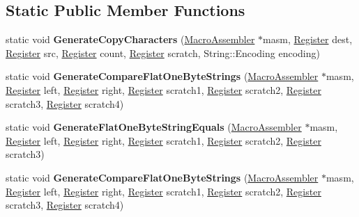 \subsection*{Static Public Member Functions}
\begin{DoxyCompactItemize}
\item 
static void {\bfseries Generate\+Copy\+Characters} (\hyperlink{classv8_1_1internal_1_1_macro_assembler}{Macro\+Assembler} $\ast$masm, \hyperlink{structv8_1_1internal_1_1_register}{Register} dest, \hyperlink{structv8_1_1internal_1_1_register}{Register} src, \hyperlink{structv8_1_1internal_1_1_register}{Register} count, \hyperlink{structv8_1_1internal_1_1_register}{Register} scratch, String\+::\+Encoding encoding)\hypertarget{classv8_1_1internal_1_1_string_helper_acd699f7bf40a599d86efca2556efde61}{}\label{classv8_1_1internal_1_1_string_helper_acd699f7bf40a599d86efca2556efde61}

\item 
static void {\bfseries Generate\+Compare\+Flat\+One\+Byte\+Strings} (\hyperlink{classv8_1_1internal_1_1_macro_assembler}{Macro\+Assembler} $\ast$masm, \hyperlink{structv8_1_1internal_1_1_register}{Register} left, \hyperlink{structv8_1_1internal_1_1_register}{Register} right, \hyperlink{structv8_1_1internal_1_1_register}{Register} scratch1, \hyperlink{structv8_1_1internal_1_1_register}{Register} scratch2, \hyperlink{structv8_1_1internal_1_1_register}{Register} scratch3, \hyperlink{structv8_1_1internal_1_1_register}{Register} scratch4)\hypertarget{classv8_1_1internal_1_1_string_helper_ac523db36072fd75b5d42b403ac6ef1ff}{}\label{classv8_1_1internal_1_1_string_helper_ac523db36072fd75b5d42b403ac6ef1ff}

\item 
static void {\bfseries Generate\+Flat\+One\+Byte\+String\+Equals} (\hyperlink{classv8_1_1internal_1_1_macro_assembler}{Macro\+Assembler} $\ast$masm, \hyperlink{structv8_1_1internal_1_1_register}{Register} left, \hyperlink{structv8_1_1internal_1_1_register}{Register} right, \hyperlink{structv8_1_1internal_1_1_register}{Register} scratch1, \hyperlink{structv8_1_1internal_1_1_register}{Register} scratch2, \hyperlink{structv8_1_1internal_1_1_register}{Register} scratch3)\hypertarget{classv8_1_1internal_1_1_string_helper_af4eb5dbd003a23d35fa965edcd1c4856}{}\label{classv8_1_1internal_1_1_string_helper_af4eb5dbd003a23d35fa965edcd1c4856}

\item 
static void {\bfseries Generate\+Compare\+Flat\+One\+Byte\+Strings} (\hyperlink{classv8_1_1internal_1_1_macro_assembler}{Macro\+Assembler} $\ast$masm, \hyperlink{structv8_1_1internal_1_1_register}{Register} left, \hyperlink{structv8_1_1internal_1_1_register}{Register} right, \hyperlink{structv8_1_1internal_1_1_register}{Register} scratch1, \hyperlink{structv8_1_1internal_1_1_register}{Register} scratch2, \hyperlink{structv8_1_1internal_1_1_register}{Register} scratch3, \hyperlink{structv8_1_1internal_1_1_register}{Register} scratch4)\hypertarget{classv8_1_1internal_1_1_string_helper_ac523db36072fd75b5d42b403ac6ef1ff}{}\label{classv8_1_1internal_1_1_string_helper_ac523db36072fd75b5d42b403ac6ef1ff}


\end{DoxyCompactItemize}
